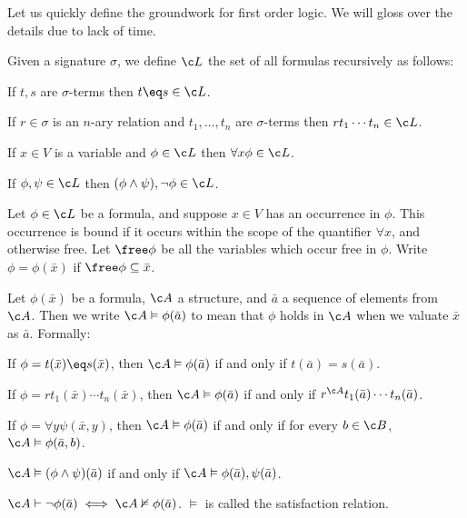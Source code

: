 Let us quickly define the groundwork for first order logic.
We will gloss over the details due to lack of time.

\bdefn

    Given a signature $\sigma$, we define $\c L$ the set of all formulas recursively as follows:
    \benum
        \item If $t,s$ are $\sigma$-terms then $t\eq s\in\c L$.
        \item If $r\in\sigma$ is an $n$-ary relation and $t_1,\dots,t_n$ are $\sigma$-terms then $rt_1\cdots t_n\in\c L$.
        \item If $x\in V$ is a variable and $\phi\in\c L$ then $\forall x\phi\in\c L$.
        \item If $\phi,\psi\in\c L$ then $(\phi\land\psi),\neg\phi\in\c L$.
    \eenum

\edefn

\bdefn

    Let $\phi\in\c L$ be a formula, and suppose $x\in V$ has an occurrence in $\phi$.
    This occurrence is {\emphcolor bound} if it occurs within the scope of the quantifier $\forall x$, and otherwise {\emphcolor free}.
    Let $\free\phi$ be all the variables which occur free in $\phi$.
    Write $\phi=\phi(\bar x)$ if $\free\phi\subseteq\bar x$.

\edefn

\bdefn

    Let $\phi(\bar x)$ be a formula, $\c A$ a structure, and $\bar a$ a sequence of elements from $\c A$.
    Then we write $\c A\vDash\phi(\bar a)$ to mean that $\phi$ holds in $\c A$ when we valuate $\bar x$ as $\bar a$.
    Formally:
    \benum
        \item If $\phi=t(\bar x)\eq s(\bar x)$, then $\c A\vDash\phi(\bar a)$ if and only if $t(\bar a)=s(\bar a)$.
        \item If $\phi=rt_1(\bar x)\cdots t_n(\bar x)$, then $\c A\vDash\phi(\bar a)$ if and only if $r^{\c A}t_1(\bar a)\cdots t_n(\bar a)$.
        \item If $\phi=\forall y\psi(\bar x,y)$, then $\c A\vDash\phi(\bar a)$ if and only if for every $b\in\c B$, $\c A\vDash\phi(\bar a,b)$.
        \item $\c A\vDash(\phi\land\psi)(\bar a)$ if and only if $\c A\vDash\phi(\bar a),\psi(\bar a)$.
        \item $\c A\vdash\neg\phi(\bar a)\iff\c A\nvDash\phi(\bar a)$.
    \eenum
    $\vDash$ is called the {\emphcolor satisfaction relation}.

\edefn

